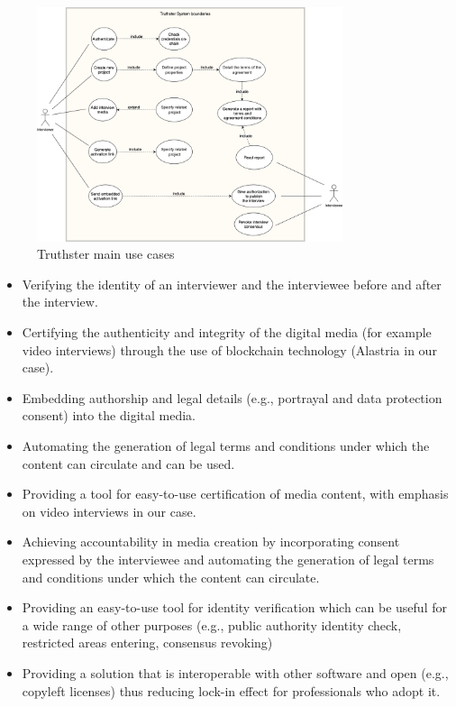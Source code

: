\documentclass[target=mst,aauheader=]{thud}
\begin{document}
\begin{figure}
    \centering
    \includegraphics[width=0.8\textwidth]{images/truthster_use_cases.png}
    \caption{Truthster main use cases}
\end{figure}

\begin{itemize}

    \item Verifying the identity of an interviewer and the interviewee before and after the interview.
    \item Certifying the authenticity and integrity of the digital media (for example video interviews) through the use of blockchain technology (Alastria in our case).
    \item Embedding authorship and legal details (e.g., portrayal and data protection consent) into the digital media.
    \item Automating the generation of legal terms and conditions under which the content can circulate and can be used.
    \item Providing a tool for easy-to-use certification of media content, with emphasis on video interviews in our case.
    \item Achieving accountability in media creation by incorporating consent expressed by the interviewee and automating the generation of legal terms and conditions under which the content can circulate.
    \item Providing an easy-to-use tool for identity verification which can be useful for a wide range of other purposes (e.g., public authority identity check, restricted areas entering, consensus revoking)
    \item Providing a solution that is interoperable with other software and open (e.g., copyleft licenses) thus reducing lock-in effect for professionals who adopt it.
    
\end{itemize}
\end{document}
